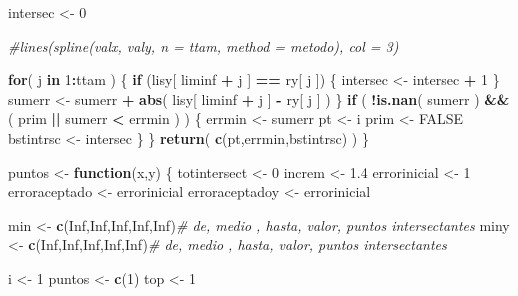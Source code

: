 \documentclass[]{article}
\newenvironment{Shaded}{\begin{snugshade}}{\end{snugshade}}
\newcommand{\KeywordTok}[1]{\textcolor[rgb]{0.13,0.29,0.53}{\textbf{#1}}}
\newcommand{\DecValTok}[1]{\textcolor[rgb]{0.00,0.00,0.81}{#1}}
\newcommand{\FloatTok}[1]{\textcolor[rgb]{0.00,0.00,0.81}{#1}}
\newcommand{\StringTok}[1]{\textcolor[rgb]{0.31,0.60,0.02}{#1}}
\newcommand{\CommentTok}[1]{\textcolor[rgb]{0.56,0.35,0.01}{\textit{#1}}}
\newcommand{\OtherTok}[1]{\textcolor[rgb]{0.56,0.35,0.01}{#1}}
\newcommand{\ControlFlowTok}[1]{\textcolor[rgb]{0.13,0.29,0.53}{\textbf{#1}}}
\newcommand{\OperatorTok}[1]{\textcolor[rgb]{0.81,0.36,0.00}{\textbf{#1}}}
\newcommand{\NormalTok}[1]{#1}
\begin{document}
\begin{Shaded}
\begin{Highlighting}[]
\NormalTok{    intersec <-}\StringTok{ }\DecValTok{0}
    
    \CommentTok{#lines(spline(valx, valy, n = ttam, method = metodo), col = 3)}
    
    \ControlFlowTok{for}\NormalTok{( j }\ControlFlowTok{in} \DecValTok{1}\OperatorTok{:}\NormalTok{ttam )}
\NormalTok{    \{}
      \ControlFlowTok{if}\NormalTok{ (lisy[ liminf }\OperatorTok{+}\StringTok{ }\NormalTok{j ] }\OperatorTok{==}\StringTok{  }\NormalTok{ry[ j ])}
\NormalTok{      \{}
\NormalTok{        intersec <-}\StringTok{ }\NormalTok{intersec }\OperatorTok{+}\StringTok{ }\DecValTok{1}
\NormalTok{      \}}
\NormalTok{      sumerr <-}\StringTok{ }\NormalTok{sumerr }\OperatorTok{+}\StringTok{ }\KeywordTok{abs}\NormalTok{( lisy[ liminf }\OperatorTok{+}\StringTok{ }\NormalTok{j ] }\OperatorTok{-}\StringTok{  }\NormalTok{ry[ j ] ) }
\NormalTok{    \}}
    \ControlFlowTok{if}\NormalTok{ ( }\OperatorTok{!}\KeywordTok{is.nan}\NormalTok{( sumerr ) }\OperatorTok{&&}\StringTok{ }\NormalTok{( prim }\OperatorTok{||}\StringTok{ }\NormalTok{sumerr }\OperatorTok{<}\StringTok{ }\NormalTok{errmin ) )}
\NormalTok{    \{}
\NormalTok{      errmin <-}\StringTok{ }\NormalTok{sumerr}
\NormalTok{      pt     <-}\StringTok{ }\NormalTok{i }
\NormalTok{      prim   <-}\StringTok{ }\OtherTok{FALSE}
\NormalTok{      bstintrsc <-}\StringTok{ }\NormalTok{intersec}
\NormalTok{    \}}
\NormalTok{  \}}
  \KeywordTok{return}\NormalTok{( }\KeywordTok{c}\NormalTok{(pt,errmin,bstintrsc) )}
\NormalTok{\}}

\NormalTok{puntos <-}\StringTok{ }\ControlFlowTok{function}\NormalTok{(x,y)}
\NormalTok{\{}
\NormalTok{  totintersect <-}\StringTok{ }\DecValTok{0}
\NormalTok{  increm <-}\StringTok{ }\FloatTok{1.4}
\NormalTok{  errorinicial   <-}\StringTok{ }\DecValTok{1}
\NormalTok{  erroraceptado  <-}\StringTok{ }\NormalTok{errorinicial}
\NormalTok{  erroraceptadoy <-}\StringTok{ }\NormalTok{errorinicial}
  
\NormalTok{  min    <-}\StringTok{ }\KeywordTok{c}\NormalTok{(}\OtherTok{Inf}\NormalTok{,}\OtherTok{Inf}\NormalTok{,}\OtherTok{Inf}\NormalTok{,}\OtherTok{Inf}\NormalTok{,}\OtherTok{Inf}\NormalTok{)}\CommentTok{# de, medio , hasta, valor, puntos intersectantes }
\NormalTok{  miny    <-}\StringTok{ }\KeywordTok{c}\NormalTok{(}\OtherTok{Inf}\NormalTok{,}\OtherTok{Inf}\NormalTok{,}\OtherTok{Inf}\NormalTok{,}\OtherTok{Inf}\NormalTok{,}\OtherTok{Inf}\NormalTok{)}\CommentTok{# de, medio , hasta, valor, puntos intersectantes }
  
\NormalTok{  i      <-}\StringTok{ }\DecValTok{1}
\NormalTok{  puntos <-}\StringTok{ }\KeywordTok{c}\NormalTok{(}\DecValTok{1}\NormalTok{)}
\NormalTok{  top    <-}\StringTok{ }\DecValTok{1} 
  

\end{Highlighting}
\end{Shaded}
\end{document}

